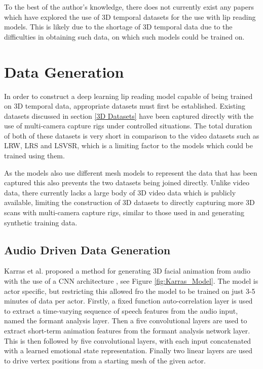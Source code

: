 \documentclass[12pt]{report}
\begin{document}
To the best of the author's knowledge, there does not currently exist any papers which have explored the use of 3D temporal datasets for the use with lip reading models. 
This is likely due to the shortage of 3D temporal data due to the difficulties in obtaining such data, on which such models could be trained on.

\section{Data Generation}
In order to construct a deep learning lip reading model capable of being trained on 3D temporal data, appropriate datasets must first be established.
Existing datasets \cite{Tzirakis2019, Cudeiro2019} discussed in section \ref{3D Datasets} have been captured directly with the use of multi-camera capture rigs under controlled situations.
The total duration of both of these datasets is very short in comparison to the video datasets such as LRW, LRS and LSVSR, which is a limiting factor to the models which could be trained using them.

As the models also use different mesh models to represent the data that has been captured this also prevents the two datasets being joined directly.
Unlike video data, there currently lacks a large body of 3D video data which is publicly available, limiting the construction of 3D datasets to directly capturing more 3D scans with multi-camera capture rigs, similar to those used in \cite{Tzirakis2019, Cudeiro2019} and generating synthetic training data.

\subsection{Audio Driven Data Generation}
Karras et al. proposed a method for generating 3D facial animation from audio with the use of a CNN architecture \cite{Karras2017a}, see Figure \ref{fig:Karras_Model}.
The model is actor specific, but restricting this allowed fro the model to be trained on just 3-5 minutes of data per actor.
Firstly, a fixed function auto-correlation layer is used to extract a time-varying sequence of speech features from the audio input, named the formant analysis layer.
Then a five convolutional layers are used to extract short-term animation features from the formant analysis network layer.
This is then followed by five convolutional layers, with each input concatenated with a learned emotional state representation.
Finally two linear layers are used to drive vertex positions from a starting mesh of the given actor.
\end{document}
